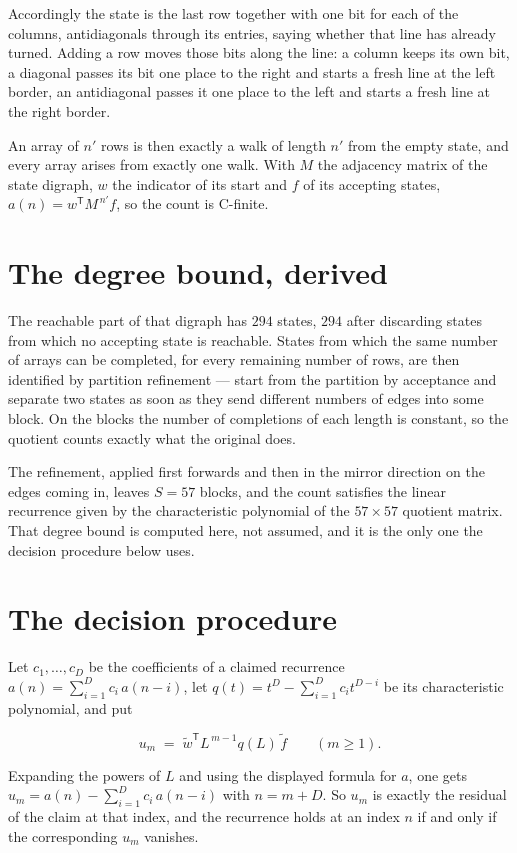 \documentclass[11pt]{article}
\theoremstyle{definition}
\begin{document}
Accordingly the state is the last row together with one bit for each of the columns, antidiagonals through its entries, saying whether that line has already turned. Adding a row moves those bits along the line: a column keeps its own bit, a diagonal passes its bit one place to the right and starts a fresh line at the left border, an antidiagonal passes it one place to the left and starts a fresh line at the right border.

An array of $n'$ rows is then exactly a walk of length $n'$ from the empty state, and every array arises from exactly one walk. With $M$ the adjacency matrix of the state digraph, $w$ the indicator of its start and $f$ of its accepting states, $a(n) = w^{\mathsf T}M^{\,n'}f$, so the count is C-finite.

\section{The degree bound, derived}

The reachable part of that digraph has $294$ states, $294$ after discarding states from which no accepting state is reachable. States from which the same number of arrays can be completed, for every remaining number of rows, are then identified by partition refinement --- start from the partition by acceptance and separate two states as soon as they send different numbers of edges into some block. On the blocks the number of completions of each length is constant, so the quotient counts exactly what the original does.

The refinement, applied first forwards and then in the mirror direction on the edges coming in, leaves $S = 57$ blocks, and the count satisfies the linear recurrence given by the characteristic polynomial of the $57 \times 57$ quotient matrix. That degree bound is computed here, not assumed, and it is the only one the decision procedure below uses.

\section{The decision procedure}

Let $c_1,\dots,c_D$ be the coefficients of a claimed recurrence $a(n) = \sum_{i=1}^{D} c_i\,a(n-i)$, let $q(t) = t^{D} - \sum_{i=1}^{D} c_i t^{D-i}$ be its characteristic polynomial, and put

\[u_m \;=\; \tilde w^{\mathsf T} L^{\,m-1} q(L)\,\tilde f \qquad (m \ge 1).\]

Expanding the powers of $L$ and using the displayed formula for $a$, one gets $u_m = a(n) - \sum_{i=1}^{D} c_i\,a(n-i)$ with $n = m + D$. So $u_m$ is exactly the residual of the claim at that index, and the recurrence holds at an index $n$ if and only if the corresponding $u_m$ vanishes.
\end{document}
